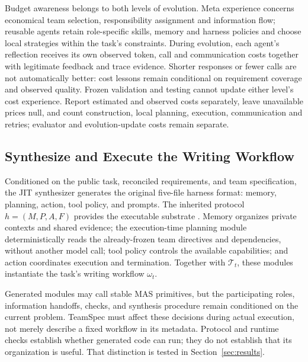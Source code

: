 \documentclass[11pt]{article}
\newcommand{\team}{\mathcal{T}}
\begin{document}
Budget awareness belongs to both levels of evolution. Meta experience concerns economical team selection, responsibility assignment and information flow; reusable agents retain role-specific skills, memory and harness policies and choose local strategies within the task's constraints. During evolution, each agent's reflection receives its own observed token, call and communication costs together with legitimate feedback and trace evidence. Shorter responses or fewer calls are not automatically better: cost lessons remain conditional on requirement coverage and observed quality. Frozen validation and testing cannot update either level's cost experience. Report estimated and observed costs separately, leave unavailable prices null, and count construction, local planning, execution, communication and retries; evaluator and evolution-update costs remain separate.

\subsection{Synthesize and Execute the Writing Workflow}
\label{sec:execution}

Conditioned on the public task, reconciled requirements, and team specification, the JIT synthesizer generates the original five-file harness format: memory, planning, action, tool policy, and prompts. The inherited protocol $h=(M,P,A,F)$ provides the executable substrate \citep{zhang2026jit}. Memory organizes private contexts and shared evidence; the execution-time planning module deterministically reads the already-frozen team directives and dependencies, without another model call; tool policy controls the available capabilities; and action coordinates execution and termination. Together with $\team_t$, these modules instantiate the task's writing workflow $\omega_t$.

Generated modules may call stable MAS primitives, but the participating roles, information handoffs, checks, and synthesis procedure remain conditioned on the current problem. TeamSpec must affect these decisions during actual execution, not merely describe a fixed workflow in its metadata. Protocol and runtime checks establish whether generated code can run; they do not establish that its organization is useful. That distinction is tested in Section~\ref{sec:results}.
\end{document}
